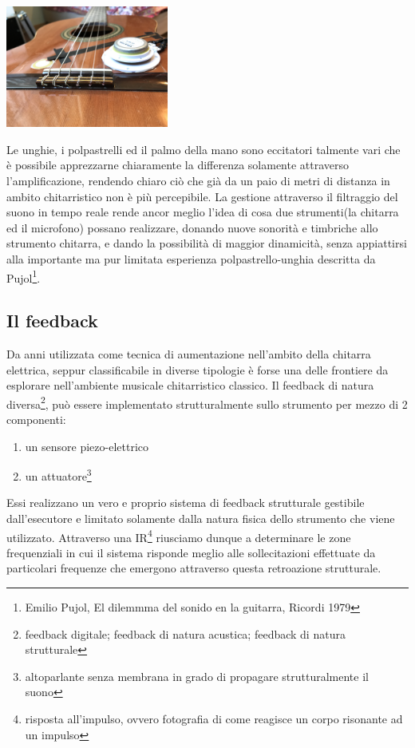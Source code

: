 \documentclass[oneside]{article}
\begin{document}
\begin{multicols*}{2}
\includegraphics[width=0.4\textwidth]{img/chit.jpg}

Le unghie, i polpastrelli ed il palmo della mano sono eccitatori talmente vari che è possibile apprezzarne chiaramente la differenza solamente attraverso l'amplificazione, rendendo chiaro ciò che già da un paio di metri di distanza in ambito chitarristico non è più percepibile. La gestione attraverso il filtraggio del suono in tempo reale rende ancor meglio l'idea di cosa due strumenti(la chitarra ed il microfono) possano realizzare, donando nuove sonorità e timbriche allo strumento chitarra, e dando la possibilità di maggior dinamicità, senza appiattirsi alla importante ma pur limitata esperienza polpastrello-unghia descritta da Pujol\footnote{Emilio Pujol, El dilemmma del sonido en la guitarra, Ricordi 1979}.

\subsection{Il feedback} 
Da anni utilizzata come tecnica di aumentazione nell'ambito della chitarra elettrica, seppur classificabile in diverse tipologie è forse una delle frontiere da esplorare nell'ambiente musicale chitarristico classico. Il feedback di natura diversa\footnote{feedback digitale; feedback di natura acustica; feedback di natura strutturale}, può essere implementato strutturalmente sullo strumento per mezzo di 2 componenti: \begin{enumerate}\item un sensore piezo-elettrico\item un attuatore\footnote{altoparlante senza membrana in grado di propagare strutturalmente il suono} \end{enumerate} Essi realizzano un vero e proprio sistema di feedback strutturale gestibile dall'esecutore e limitato solamente dalla natura fisica dello strumento che viene utilizzato. Attraverso una IR\footnote{risposta all’impulso, ovvero fotografia di come reagisce un corpo risonante ad un impulso} riusciamo dunque a determinare le zone frequenziali in cui il sistema risponde meglio alle sollecitazioni effettuate da particolari frequenze che emergono attraverso questa retroazione strutturale.
\newline


\end{multicols*}
\end{document}
